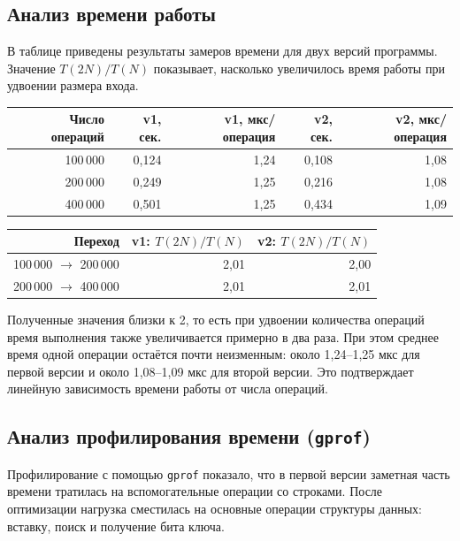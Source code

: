 \subsection{Анализ времени работы}

В таблице приведены результаты замеров времени для двух версий программы. Значение
$T(2N) / T(N)$ показывает, насколько увеличилось время работы при удвоении размера входа.

\begin{center}
\begin{tabular}{|r|r|r|r|r|}
\hline
\textbf{Число операций} &
\textbf{v1, сек.} &
\textbf{v1, мкс/операция} &
\textbf{v2, сек.} &
\textbf{v2, мкс/операция} \\ \hline
100\,000 & 0{,}124 & 1{,}24 & 0{,}108 & 1{,}08 \\ \hline
200\,000 & 0{,}249 & 1{,}25 & 0{,}216 & 1{,}08 \\ \hline
400\,000 & 0{,}501 & 1{,}25 & 0{,}434 & 1{,}09 \\ \hline
\end{tabular}
\end{center}

\begin{center}
\begin{tabular}{|r|r|r|}
\hline
\textbf{Переход} & \textbf{v1: $T(2N)/T(N)$} & \textbf{v2: $T(2N)/T(N)$} \\ \hline
100\,000 $\rightarrow$ 200\,000 & 2{,}01 & 2{,}00 \\ \hline
200\,000 $\rightarrow$ 400\,000 & 2{,}01 & 2{,}01 \\ \hline
\end{tabular}
\end{center}

Полученные значения близки к 2, то есть при удвоении количества операций время выполнения также
увеличивается примерно в два раза. При этом среднее время одной операции остаётся почти неизменным:
около 1{,}24--1{,}25 мкс для первой версии и около 1{,}08--1{,}09 мкс для второй версии.
Это подтверждает линейную зависимость времени работы от числа операций.

\subsection{Анализ профилирования времени (\texttt{gprof})}

Профилирование с помощью \texttt{gprof} показало, что в первой версии заметная часть времени
тратилась на вспомогательные операции со строками. После оптимизации нагрузка сместилась на основные
операции структуры данных: вставку, поиск и получение бита ключа.

